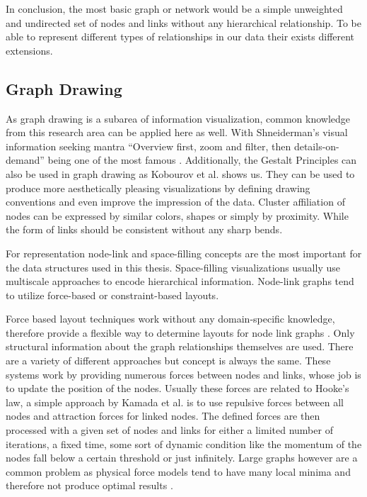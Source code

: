 In conclusion, the most basic graph or network would be a simple unweighted and undirected set of nodes and links without any hierarchical relationship. To be able to represent different types of relationships in our data their exists different extensions. 

\subsection{Graph Drawing}

As graph drawing is a subarea of information visualization, common knowledge from this research area can be applied here as well. With Shneiderman's visual information seeking mantra “Overview first, zoom and filter, then details-on-demand” being one of the most famous \cite{shneiderman_eyes_1996}. Additionally, the Gestalt Principles can also be used in graph drawing as Kobourov et al.
\cite{kobourov_gestalt_2015} shows us. They can be used to produce more aesthetically pleasing visualizations by defining drawing conventions and even improve the impression of the data. Cluster affiliation of nodes can be expressed by similar colors, shapes or simply by proximity. While the form of links should be consistent without any sharp bends.

For representation node-link and space-filling concepts are the most important for the data structures used in this thesis. Space-filling visualizations usually use multiscale approaches to encode hierarchical information. Node-link graphs tend to utilize force-based or constraint-based layouts\cite{von_landesberger_visual_2011}.

Force based layout techniques work without any domain-specific knowledge, therefore provide a flexible way to determine layouts for node link graphs \cite{kobourov_spring_2012}. Only structural information about the graph relationships themselves are used. 
There are a variety of different approaches but concept is always the same. 
These systems work by providing numerous forces between nodes and links, whose job is to update the position of the nodes. Usually these forces are related to Hooke's law, a simple approach by Kamada et al. \cite{kamada_algorithm_1989} is to use repulsive forces between all nodes and attraction forces for linked nodes.
The defined forces are then processed with a given set of nodes and links for either a limited number of iterations, a fixed time, some sort of dynamic condition like the momentum of the nodes fall below a certain threshold or just infinitely.
Large graphs however are a common problem as physical force models tend to have many local minima and therefore not produce optimal results \cite{kobourov_spring_2012}.

